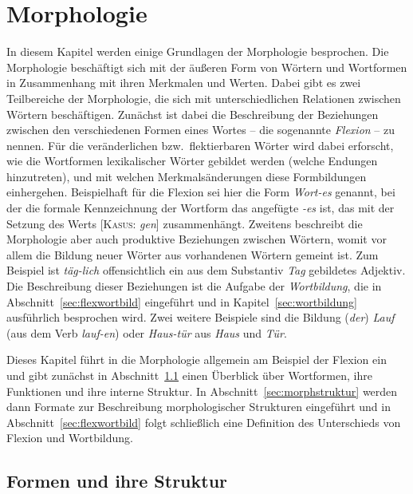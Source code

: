 \chapter{Morphologie}

\label{sec:morphologie}

In diesem Kapitel werden einige Grundlagen der Morphologie besprochen.
Die Morphologie beschäftigt sich mit der äußeren Form von Wörtern und Wortformen in Zusammenhang mit ihren Merkmalen und Werten.
Dabei gibt es zwei Teilbereiche der Morphologie, die sich mit unterschiedlichen Relationen zwischen Wörtern beschäftigen.
Zunächst ist dabei die Beschreibung der Beziehungen zwischen den verschiedenen Formen eines Wortes -- die sogenannte \textit{Flexion} -- zu nennen.
Für die veränderlichen bzw.\ flektierbaren Wörter wird dabei erforscht, wie die Wortformen lexikalischer Wörter gebildet werden (\zB welche Endungen hinzutreten), und mit welchen Merkmalsänderungen diese Formbildungen einhergehen.
Beispielhaft für die Flexion sei hier die Form \textit{Wort-es} genannt, bei der die formale Kennzeichnung der Wortform das angefügte \textit{-es} ist, das mit der Setzung des Werts [\textsc{Kasus}: \textit{gen}] zusammenhängt.
Zweitens beschreibt die Morphologie aber auch produktive Beziehungen zwischen Wörtern, womit vor allem die Bildung neuer Wörter aus vorhandenen Wörtern gemeint ist.
Zum Beispiel ist \textit{täg-lich} offensichtlich ein aus dem Substantiv \textit{Tag} gebildetes Adjektiv.
Die Beschreibung dieser Beziehungen ist die Aufgabe der \textit{Wortbildung}, die in Abschnitt~\ref{sec:flexwortbild} eingeführt und in Kapitel~\ref{sec:wortbildung} ausführlich besprochen wird.
Zwei weitere Beispiele sind die Bildung (\textit{der}) \textit{Lauf} (aus dem Verb \textit{lauf-en}) oder \textit{Haus-tür} aus \textit{Haus} und \textit{Tür}.

Dieses Kapitel führt in die Morphologie allgemein am Beispiel der Flexion ein und gibt zunächst in Abschnitt~\ref{sec:morphkond} einen Überblick über Wortformen, ihre Funktionen und ihre interne Struktur.
In Abschnitt~\ref{sec:morphstruktur} werden dann Formate zur Beschreibung morphologischer Strukturen eingeführt und in Abschnitt~\ref{sec:flexwortbild} folgt schließlich eine Definition des Unterschieds von Flexion und Wortbildung.

\section{Formen und ihre Struktur}

\label{sec:morphkond}

